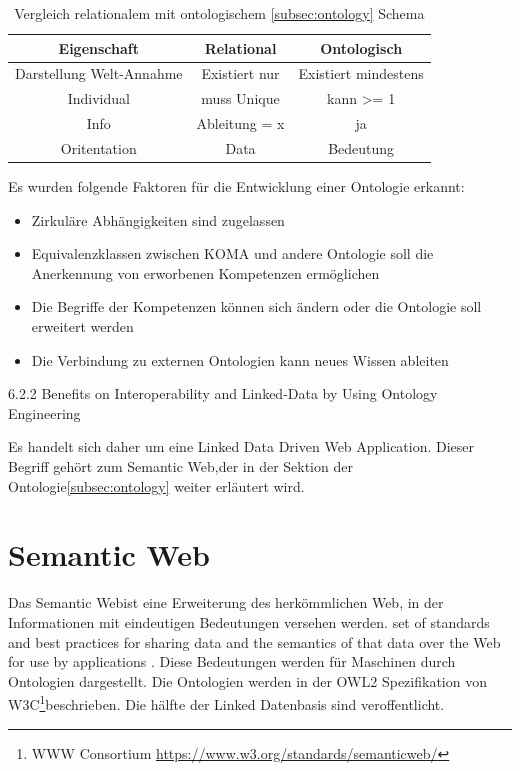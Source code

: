 \documentclass[
12pt,
english,
ngerman,
headsepline,
twoside,
openright,
numbers=noenddot,version=first
]{scrreprt}
\providecommand{\tabularnewline}{\\}
\begin{document}
\begin{table}
\caption{Vergleich relationalem mit ontologischem \ref{subsec:ontology} Schema}

\centering{}
\begin{tabular}{ccc}
\noalign{\vskip\doublerulesep}
Eigenschaft & Relational & Ontologisch \tabularnewline[\doublerulesep]
\hline\noalign{\vskip\doublerulesep}
Darstellung Welt-Annahme & Existiert nur & Existiert mindestens \tabularnewline[\doublerulesep]
\noalign{\vskip\doublerulesep}
Individual & muss Unique & kann >= 1 \tabularnewline[\doublerulesep]
\noalign{\vskip\doublerulesep}
Info & Ableitung = x & ja \tabularnewline[\doublerulesep]
\noalign{\vskip\doublerulesep}
Oritentation & Data & Bedeutung \tabularnewline[\doublerulesep]

\end{tabular}
\end{table}

Es wurden folgende Faktoren für die Entwicklung einer Ontologie erkannt:
\begin{itemize}
	\item Zirkuläre Abhängigkeiten sind zugelassen
	\item Equivalenzklassen zwischen KOMA und andere Ontologie soll die Anerkennung von erworbenen Kompetenzen ermöglichen
	\item Die Begriffe der Kompetenzen können sich ändern oder die Ontologie soll erweitert werden
	\item Die Verbindung zu externen Ontologien kann neues Wissen ableiten
\end{itemize}

6.2.2 \cite{OntoCloud}Benefits on Interoperability and Linked-Data by Using
Ontology Engineering

Es handelt sich daher um eine \glqq Linked Data Driven Web Application\grqq.%
Dieser Begriff gehört zum \glqq Semantic Web\grqq,der in der Sektion der Ontologie\ref{subsec:ontology} weiter erläutert wird.

\section{Semantic Web}

Das \glqq Semantic Web\grqq ist eine Erweiterung des herkömmlichen Web, in der Informationen mit eindeutigen Bedeutungen versehen werden\cite{OntoWhat2}.
set of standards and best practices for sharing data and the semantics of that data over the Web for use by applications\cite{SparqlLearn} .
 Diese Bedeutungen werden für Maschinen durch Ontologien dargestellt. 
Die Ontologien werden in der OWL2 Spezifikation von W3C\footnote{WWW Consortium \url{https://www.w3.org/standards/semanticweb/}}beschrieben. Die hälfte der Linked Datenbasis sind veroffentlicht. 
\end{document}
